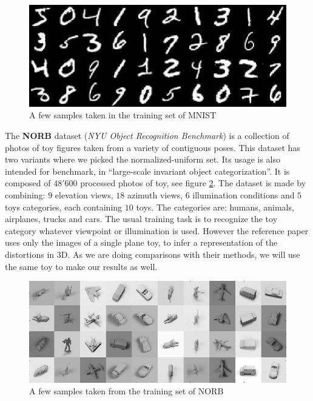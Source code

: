 \documentclass[a4paper,12pt]{report}
\begin{document}
\begin{figure}[h]
    \begin{center}
        \includegraphics{thesis_figures/mnist.jpg}
    \end{center}
    \caption{A few samples taken in the training set of MNIST}
    \label{fig:mnist}
\end{figure}

The {\bf NORB} dataset ({\em NYU Object Recognition Benchmark}) is a collection of photos of toy figures taken from a variety of contiguous poses.
This dataset has two variants where we picked the normalized-uniform set.
Its usage is also intended for benchmark, in ``large-scale invariant object categorization''.
It is composed of $48'600$ processed photos of toy, see figure \ref{fig:norb}.
The dataset is made by combining: $9$ elevation views, $18$ azimuth views, $6$ illumination conditions and $5$ toys categories, each containing $10$ toys.
The categories are: humans, animals, airplanes, trucks and cars.
The usual training task is to recognize the toy category whatever viewpoint or illumination is used.
However the reference paper uses only the images of a single plane toy, to infer a representation of the distortions in 3D.
As we are doing comparisons with their methods, we will use the same toy to make our results as well.

\begin{figure}[h]
    \begin{center}
        \includegraphics{thesis_figures/norb.jpg}
    \end{center}
    \caption{A few samples taken from the training set of NORB}
    \label{fig:norb}
\end{figure}
\end{document}
